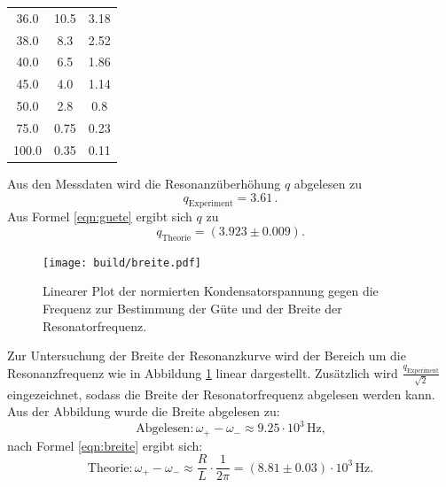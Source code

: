 \begin{table}
\begin{tabular}{ccc}
		36.0                        & 10.5                      & 3.18                      \\
		38.0                        & 8.3                       & 2.52                      \\
		40.0                        & 6.5                       & 1.86                      \\
		45.0                        & 4.0                       & 1.14                      \\
		50.0                        & 2.8                       & 0.8                       \\
		75.0                        & 0.75                      & 0.23                      \\
		100.0                       & 0.35                      & 0.11                      \\
		\bottomrule
	\end{tabular}
\end{table}

Aus den Messdaten wird die Resonanzüberhöhung $q$ abgelesen zu
\begin{equation*}
	q_\mathrm{Experiment}= 3.61 \, .
\end{equation*}
Aus Formel \eqref{eqn:guete} ergibt sich $q$ zu
\begin{equation*}
	q_\mathrm{Theorie}= (3.923 \pm 0.009) .
\end{equation*}

\begin{figure}
	\texttt{[image: build/breite.pdf]}
	\caption{Linearer Plot der normierten Kondensatorspannung gegen die Frequenz zur Bestimmung der Güte und der Breite der Resonatorfrequenz.}
	\label{fig:breite}
\end{figure}
Zur Untersuchung der Breite der Resonanzkurve wird der Bereich um die Resonanzfrequenz
wie in Abbildung \ref{fig:breite} linear dargestellt.
Zusätzlich wird $\frac{q_\mathrm{Experiment}}{\sqrt{2}}$ eingezeichnet, sodass die Breite der Resonatorfrequenz abgelesen werden kann.
Aus der Abbildung wurde die Breite abgelesen zu:
\begin{equation*}
	\text{Abgelesen}: \omega_+ - \omega_- \approx 9.25 \cdot 10^{3} \,\si{\Hz} \text{,}
\end{equation*}
nach Formel \eqref{eqn:breite} ergibt sich:
\begin{equation*}
	\text{Theorie}: 	\omega_+ - \omega_- \approx \frac{R}{L}\cdot \frac{1}{2\pi}=(8.81\pm 0.03) \cdot 10^{3} \,\si{\Hz} \text{.}
\end{equation*}
